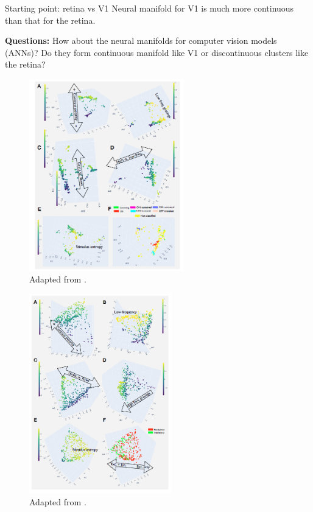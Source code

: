 \documentclass[xcolor={dvipsnames,svgnames}]{beamer}
\begin{document}
\begin{frame}{Starting point: retina vs V1}
Neural manifold for V1 is much more continuous than that for the retina. 

\textbf{Questions:} How about the neural manifolds for computer vision models (ANNs)? Do they form continuous manifold like V1 or discontinuous clusters like the retina? 

    \begin{minipage}[t]{.45\linewidth}  
    \begin{figure}
            \includegraphics[width=0.6\textwidth]{presentation/embeddings/retina-manifold.PNG}
            \caption{Adapted from \cite{dyballa_manifold_2021}.}
        \end{figure} 
    \end{minipage}
      \begin{minipage}[t]{.45\linewidth}   
      \begin{figure}         \includegraphics[width=0.55\textwidth]{presentation/embeddings/v1-manifold.PNG}
      \caption{Adapted from \cite{dyballa_manifold_2021}.}
            \end{figure} 
    \end{minipage}
\end{frame}
\end{document}
